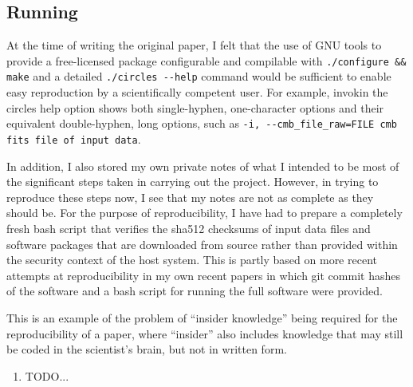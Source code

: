 \subsection{Running}

At the time of writing the original paper, I felt that the use of GNU
tools to provide a free-licensed package configurable and compilable
with {\tt ./configure \&\& make} and a detailed {\tt ./circles
  -{}-help} command would be sufficient to enable easy reproduction by
a scientifically competent user. For example, invokin the {\sc
  circles} help option shows both single-hyphen, one-character options
and their equivalent double-hyphen, long options, such as
\mbox{{\tt -i,  -{}-cmb\_file\_raw=FILE cmb fits file of input data}}.
\sloppy

\fussy
In addition, I also stored my own private notes of what I intended to
be most of the significant steps taken in carrying out the project.
However, in trying to reproduce these steps now, I see that my notes
are not as complete as they should be. For the purpose of
reproducibility, I have had to prepare a completely fresh {\sc bash}
script that verifies the sha512 checksums of input data files and
software packages that are downloaded from source rather than provided
within the security context of the host system. This is partly based
on more recent attempts at reproducibility in my own recent papers in
which {\sc git} commit hashes of the
software\supercite{Roukema17silvir} and a {\sc bash} script for
running the full software\supercite{RO19flatness} were provided.

This is an example of the problem of ``insider knowledge'' being
required for the reproducibility of a paper, where ``insider'' also
includes knowledge that may still be coded in the scientist's brain,
but not in written form.


\begin{enumerate}
\item
  TODO...
\end{enumerate}
